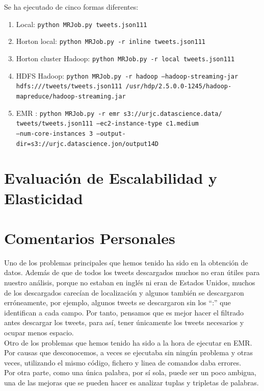\documentclass[12pt,a4paper]{article}
\begin{document}
Se ha ejecutado de cinco formas diferentes:
\begin{enumerate}
\item Local: \texttt{python MRJob.py tweets.json111}
\item Horton local: \texttt{python MRJob.py -r inline tweets.json111}
\item Horton cluster Hadoop: \texttt{python MRJob.py -r local tweets.json111}
\item HDFS Hadoop: \texttt{python MRJob.py -r hadoop --hadoop-streaming-jar \\ hdfs:///tweets/tweets.json111  /usr/hdp/2.5.0.0-1245/hadoop-\\mapreduce/hadoop-streaming.jar}
\item EMR : \texttt{python MRJob.py -r emr s3://urjc.datascience.data/\\tweets/tweets.json111 --ec2-instance-type c1.medium\\ --num-core-instances 3 --output-dir=s3://urjc.datascience.jon/output14D}
\end{enumerate}

\section{Evaluación de Escalabilidad y Elasticidad}

\section{Comentarios Personales}

Uno de los problemas principales que hemos tenido ha sido en la obtención de datos. Además de que de todos los tweets descargados muchos no eran útiles para nuestro análisis, porque no estaban en inglés ni eran de Estados Unidos, muchos de los descargados carecían de localización y algunos también se descargaron erróneamente, por ejemplo, algunos tweets se descargaron sin los ``:'' que identifican a cada campo. Por tanto, pensamos que es mejor hacer el filtrado antes descargar los tweets, para así, tener únicamente los tweets necesarios y ocupar menos espacio.\\

Otro de los problemas que hemos tenido ha sido a la hora de ejecutar en EMR. Por causas que desconocemos, a veces se ejecutaba sin ningún problema y otras veces, utilizando el mismo código, fichero y linea de comandos daba errores.\\

Por otra parte, como una única palabra, por sí sola, puede ser un poco ambigua, una de las mejoras que se pueden hacer es analizar tuplas y tripletas de palabras.\\
\end{document}
